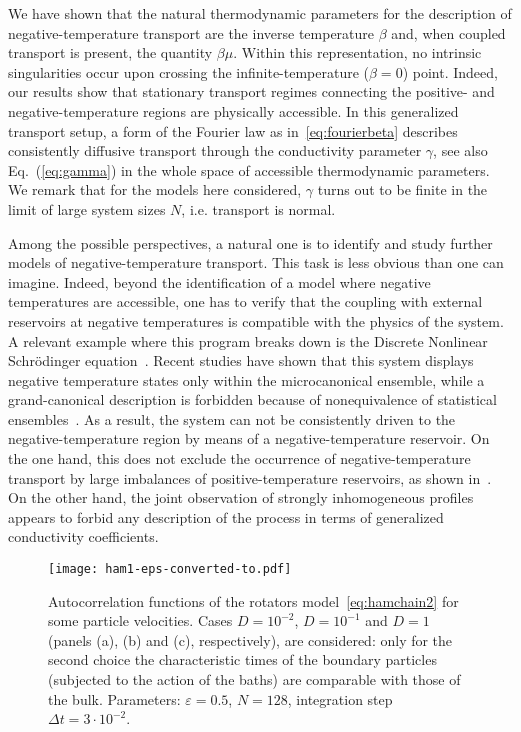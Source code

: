 \documentclass[iop, twocolumns, amssymb,notitlepage]{revtex4-1}
\begin{document}
We have shown that the natural thermodynamic parameters for the description of negative-temperature transport are the inverse temperature $\beta$
and, when coupled transport is present, the quantity $\beta\mu$.
Within this representation, no intrinsic singularities occur upon crossing the infinite-temperature ($\beta=0$) point.
Indeed, our results show that stationary transport regimes connecting the positive- and negative-temperature regions are
physically accessible. In this generalized transport setup, a form of the Fourier law as in~\eqref{eq:fourierbeta} describes consistently diffusive transport through  the conductivity parameter
$\gamma$, see also Eq.~(\ref{eq:gamma}) in the whole space of accessible thermodynamic parameters.
 We remark that for the models here considered, $\gamma$ turns out to be finite in the  limit of large system sizes $N$, i.e.
 transport is normal. 

Among the possible perspectives, a natural one is to identify and study further models of negative-temperature
transport. This task is less obvious than one can imagine. Indeed, beyond the identification of a model where negative 
temperatures are accessible, one has to verify that the coupling with external reservoirs at negative temperatures 
is compatible with the physics of the  system. A relevant example where this program
breaks down is the Discrete Nonlinear Schr\"odinger equation~\cite{kevrekidis09}. Recent studies have shown that this system displays negative temperature states only 
within the microcanonical ensemble, while a grand-canonical description is forbidden because of nonequivalence of statistical
ensembles~\cite{GILM1,GILM2}. As a result, the system can not be consistently driven to the negative-temperature region by means of a negative-temperature reservoir. On the one hand, this does not exclude the occurrence of negative-temperature transport by 
 large imbalances of positive-temperature reservoirs, as shown in~\cite{iubini17entropy}. On the other hand, the joint observation of
strongly inhomogeneous profiles  appears to forbid any description of the process in terms of generalized conductivity coefficients.




\appendix

 \begin{figure}
 \centering
\texttt{[image: ham1-eps-converted-to.pdf]}
\caption{\label{fig:ham1} Autocorrelation functions of the rotators model~\eqref{eq:hamchain2}  for some particle velocities. Cases $D=10^{-2}$, $D=10^{-1}$ and $D=1$ (panels (a), (b) and (c), respectively), are considered: only for the second choice the characteristic times of the boundary particles (subjected to the action of the baths) are comparable with those of the bulk. Parameters: $\varepsilon=0.5$, $N=128$, integration step $\Delta t =3 \cdot 10^{-2}$.}
 \end{figure}
\end{document}
